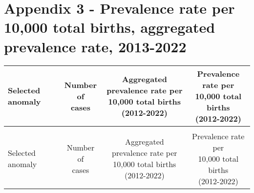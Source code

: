 \documentclass[
]{krantz}
\begin{document}
\hypertarget{section-a23}{%
\section{Appendix 3 - Prevalence rate per 10,000 total births, aggregated prevalence rate, 2013-2022}\label{section-a23}}

\begingroup\fontsize{8}{10}\selectfont

\begin{longtable}[t]{>{\raggedright\arraybackslash}m{4cm}cc>{}c}
\toprule
Selected anomaly & \makecell[c]{Number of \\ cases} & \makecell[c]{Aggregated prevalence rate per \\ 10,000 total births \\ (2012-2022)} & \makecell[c]{Prevalence rate per \\ 10,000 total births \\ (2012-2022)}\\
\midrule
\endfirsthead
\multicolumn{4}{@{}l}{\textit{(continued)}}\\
\toprule
Selected anomaly & \makecell[c]{Number of \\ cases} & \makecell[c]{Aggregated prevalence rate per \\ 10,000 total births \\ (2012-2022)} & \makecell[c]{Prevalence rate per \\ 10,000 total births \\ (2012-2022)}\\
\midrule
\endhead


\end{longtable}
\end{document}
